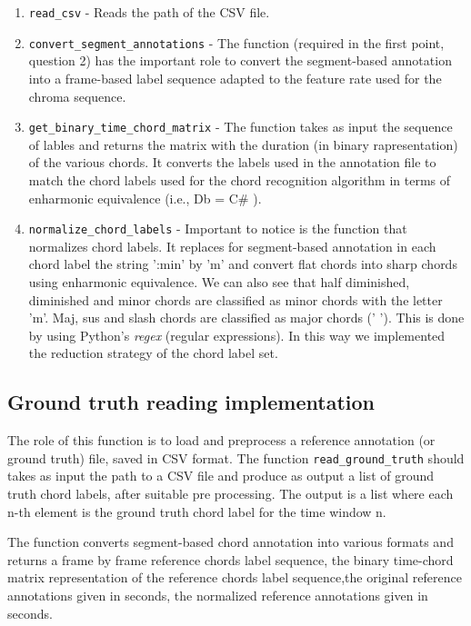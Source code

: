 \documentclass{article}
\begin{document}
\begin{enumerate}
	\item \verb|read_csv| - Reads the path of the CSV file.
	\item \verb|convert_segment_annotations| - The function (required in the first point, question 2) has the important role to convert the segment-based annotation into a frame-based label sequence adapted to the feature rate used for the chroma sequence.
	\item \verb|get_binary_time_chord_matrix| - The function takes as input the sequence of lables and returns the matrix with the duration (in binary rapresentation) of the various chords. It converts the labels used in the annotation file to match the chord labels used for the chord recognition
algorithm in terms of enharmonic equivalence (i.e., Db = C\# ).
	\item \verb|normalize_chord_labels| - Important to notice is the function that normalizes chord labels. It replaces for segment-based annotation in each chord label the string ':min' by 'm' and convert flat chords into sharp chords using enharmonic equivalence. We can also see that half diminished, diminished and minor chords are classified as minor chords with the letter 'm'. Maj, sus and slash  chords are classified as major chords (' '). This is done by using Python's \textit{regex} (regular expressions). In this way we implemented the reduction strategy of the chord label set.
\end{enumerate}

\subsection*{Ground truth reading implementation}
The role of this function is to load and preprocess a reference annotation (or ground truth) file, saved in CSV format. The function  \verb |read_ground_truth| should takes as input the path to a CSV file and produce as output a list of ground truth chord labels, after suitable pre processing. The output is a list where each n-th element is the ground truth chord label for the time window n. 



The function converts segment-based chord annotation into various formats and returns a frame by frame reference chords label sequence, the binary time-chord matrix representation of the reference chords label sequence,the original reference annotations given in seconds, the normalized reference annotations given in seconds.
\end{document}
